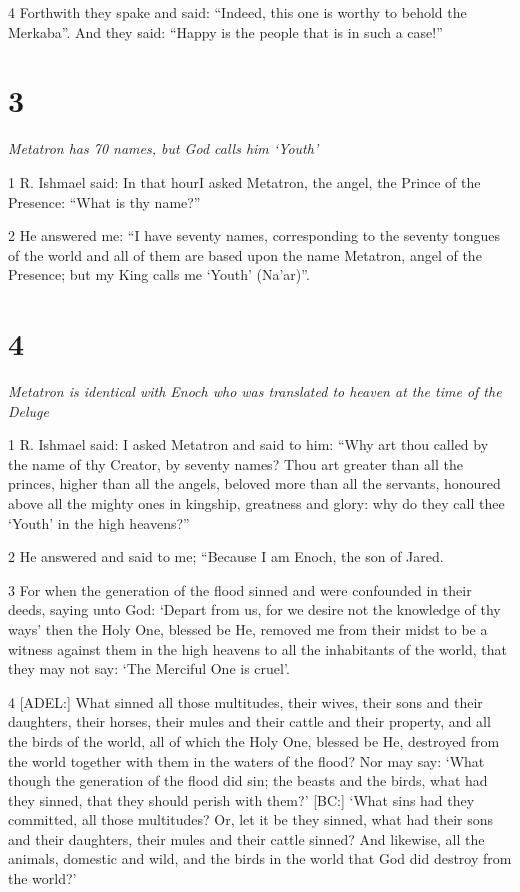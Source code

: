 \par 4 Forthwith they spake and said: “Indeed, this one is worthy to behold the Merkaba”. And they said: “Happy is the people that is in such a case!”

\chapter{3}

\par \textit{Metatron has 70 names, but God calls him ‘Youth’}

\par 1 R. Ishmael said: In that hourI asked Metatron, the angel, the Prince of the Presence: “What is thy name?” 

\par 2 He answered me: “I have seventy names, corresponding to the seventy tongues of the world and all of them are based upon the name Metatron, angel of the Presence; but my King calls me ‘Youth’ (Na'ar)”.

\chapter{4}

\par \textit{Metatron is identical with Enoch who was translated to heaven at the time of the Deluge}

\par 1 R. Ishmael said: I asked Metatron and said to him: “Why art thou called by the name of thy Creator, by seventy names? Thou art greater than all the princes, higher than all the angels, beloved more than all the servants, honoured above all the mighty ones in kingship, greatness and glory: why do they call thee ‘Youth’ in the high heavens?”

\par 2 He answered and said to me; “Because I am Enoch, the son of Jared.

\par 3 For when the generation of the flood sinned and were confounded in their deeds, saying unto God: ‘Depart from us, for we desire not the knowledge of thy ways’ then the Holy One, blessed be He, removed me from their midst to be a witness against them in the high heavens to all the inhabitants of the world, that they may not say: ‘The Merciful One is cruel’. 

\par 4 [ADEL:] What sinned all those multitudes, their wives, their sons and their daughters, their horses, their mules and their cattle and their property, and all the birds of the world, all of which the Holy One, blessed be He, destroyed from the world together with them in the waters of the flood? Nor may say: ‘What though the generation of the flood did sin; the beasts and the birds, what had they sinned, that they should perish with them?’ [BC:] ‘What sins had they committed, all those multitudes? Or, let it be they sinned, what had their sons and their daughters, their mules and their cattle sinned? And likewise, all the animals, domestic and wild, and the birds in the world that God did destroy from the world?’

